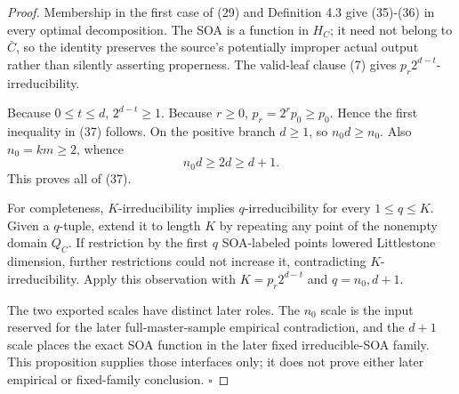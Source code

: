 \begin{proof}
Membership in the first case of (29) and Definition 4.3 give (35)-(36) in
every optimal decomposition. The SOA is a function in \(H_C\); it need not
belong to \(\bar C\), so the identity preserves the source's potentially
improper actual output rather than silently asserting properness.
The valid-leaf clause (7) gives
\(p_r2^{d-t}\)-irreducibility.

Because \(0\le t\le d\), \(2^{d-t}\ge1\). Because \(r\ge0\),
\(p_r=2^rp_0\ge p_0\). Hence the first inequality in (37) follows.
On the positive branch \(d\ge1\), so \(n_0d\ge n_0\). Also
\(n_0=km\ge2\), whence
\[
 n_0d\ge2d\ge d+1.
\]
This proves all of (37).

For completeness, \(K\)-irreducibility implies \(q\)-irreducibility for
every \(1\le q\le K\). Given a \(q\)-tuple, extend it to length \(K\) by
repeating any point of the nonempty domain \(Q_C\). If restriction by the
first \(q\) SOA-labeled points lowered Littlestone dimension, further
restrictions could not increase it, contradicting \(K\)-irreducibility.
Apply this observation with
\(K=p_r2^{d-t}\) and \(q=n_0,d+1\).

The two exported scales have distinct later roles. The \(n_0\) scale is
the input reserved for the later full-master-sample empirical
contradiction, and the \(d+1\) scale places the exact SOA function in the
later fixed irreducible-SOA family. This proposition supplies those
interfaces only; it does not prove either later empirical or fixed-family
conclusion. \(\square\)


\end{proof}

